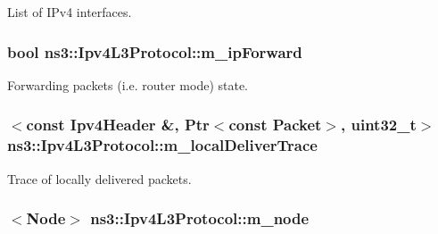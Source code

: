 List of I\+Pv4 interfaces. 

\subsubsection[{\texorpdfstring{m\+\_\+ip\+Forward}{m_ipForward}}]{\setlength{\rightskip}{0pt plus 5cm}bool ns3\+::\+Ipv4\+L3\+Protocol\+::m\+\_\+ip\+Forward\hspace{0.3cm}{\ttfamily [private]}}\hypertarget{classns3_1_1Ipv4L3Protocol_a2dc4e9e459bb2ee5eab3af65df316a15}{}\label{classns3_1_1Ipv4L3Protocol_a2dc4e9e459bb2ee5eab3af65df316a15}


Forwarding packets (i.\+e. router mode) state. 

\subsubsection[{\texorpdfstring{m\+\_\+local\+Deliver\+Trace}{m_localDeliverTrace}}]{$<$const {\bf Ipv4\+Header} \&, {\bf Ptr}$<$const {\bf Packet}$>$, uint32\+\_\+t$>$ ns3\+::\+Ipv4\+L3\+Protocol\+::m\+\_\+local\+Deliver\+Trace\hspace{0.3cm}{\ttfamily [private]}}\hypertarget{classns3_1_1Ipv4L3Protocol_a70adc805da9b70e8fb6f2a998f4df446}{}\label{classns3_1_1Ipv4L3Protocol_a70adc805da9b70e8fb6f2a998f4df446}


Trace of locally delivered packets. 

\subsubsection[{\texorpdfstring{m\+\_\+node}{m_node}}]{$<${\bf Node}$>$ ns3\+::\+Ipv4\+L3\+Protocol\+::m\+\_\+node\hspace{0.3cm}{\ttfamily [private]}}\hypertarget{classns3_1_1Ipv4L3Protocol_ad2cc5076c247724f1e99b398edc1965a}{}\label{classns3_1_1Ipv4L3Protocol_ad2cc5076c247724f1e99b398edc1965a}


